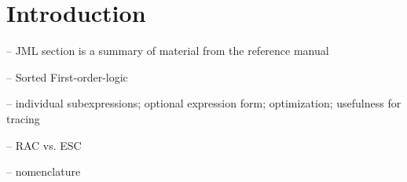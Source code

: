 \chapter{Introduction}

-- JML section is a summary of material from the reference manual

-- Sorted First-order-logic

-- individual subexpressions; optional expression form; optimization; usefulness for tracing

-- RAC vs. ESC

-- nomenclature


